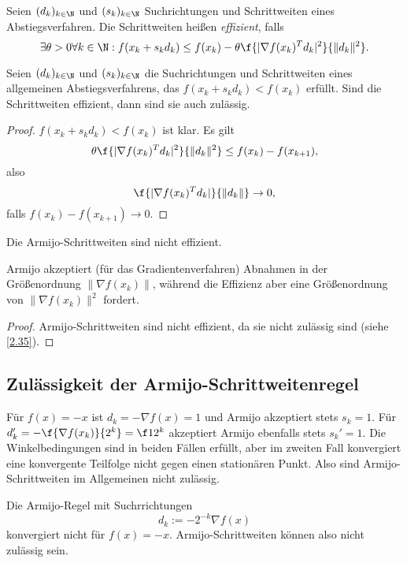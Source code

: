 \begin{df} \label{2.33}
	Seien $(d_k)_{k\in \N}$ und $(s_k)_{k\in\N}$ Suchrichtungen und Schrittweiten eines Abstiegsverfahren.
	Die Schrittweiten heißen \emph{effizient}, falls
	\[
		\exists \theta > 0 \forall k \in \N
		: f(x_k + s_k d_k) \le f(x_k) - \theta \f {|\nabla f(x_k)^T d_k|^2}{\|d_k\|^2}.
	\]
\end{df}

\begin{st} \label{2.34}
	Seien $(d_k)_{k\in\N}$ und $(s_k)_{k\in\N}$ die Suchrichtungen und Schrittweiten eines allgemeinen Abstiegsverfahrens, das $f(x_k + s_k d_k) < f(x_k)$ erfüllt.
	Sind die Schrittweiten effizient, dann sind sie auch zulässig.
	\begin{proof}
		$f(x_k+s_kd_k) < f(x_k)$ ist klar.
		Es gilt
		\[
			\theta \f {|\nabla f(x_k)^T d_k|^2}{\|d_k\|^2}
			\le f(x_k) - f(x_{k+1}),
		\]
		also
		\[
			\f{|\nabla f(x_k)^T d_k|}{\|d_k\|} \to 0,
		\]
		falls $f(x_k) - f(x_{k+1}) \to 0$.
	\end{proof}
\end{st}

\begin{nt*}
	Die Armijo-Schrittweiten sind nicht effizient.

	Armijo akzeptiert (für das Gradientenverfahren) Abnahmen in der Größenordnung $\|\nabla f(x_k)\|$, während die Effizienz aber eine Größenordnung von $\|\nabla f(x_k)\|^2$ fordert.

	\begin{proof}
		Armijo-Schrittweiten sind nicht effizient, da sie nicht zulässig sind (siehe \ref{2.35}).
	\end{proof}
\end{nt*}

\subsection{Zulässigkeit der Armijo-Schrittweitenregel}

Für $f(x) = -x$ ist $d_k = - \nabla f(x) = 1$ und Armijo akzeptiert stets $s_k = 1$.
Für $d_k' = - \f{\nabla f(x_k)}{2^k} = \f 1{2^k}$ akzeptiert Armijo ebenfalls stets $s_k' = 1$.
Die Winkelbedingungen sind in beiden Fällen erfüllt, aber im zweiten Fall konvergiert eine konvergente Teilfolge nicht gegen einen stationären Punkt.
Also sind Armijo-Schrittweiten im Allgemeinen nicht zulässig.

\begin{ex} \label{2.35}
	Die Armijo-Regel mit Suchrrichtungen
	\[
		d_k := -2^{-k} \nabla f(x)
	\]
	konvergiert nicht für $f(x) = -x$.
	Armijo-Schrittweiten können also nicht zulässig sein.
\end{ex}

